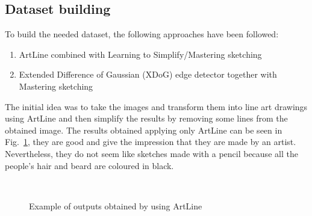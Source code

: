 \subsection{Dataset building}
To build the needed dataset, the following approaches have been followed:
\begin{enumerate}
    \item ArtLine combined with Learning to Simplify/Mastering sketching
    \item Extended Difference of Gaussian (XDoG) edge detector together with Mastering sketching
\end{enumerate}
The initial idea was to take the images and transform them into line art drawings using ArtLine and then simplify the results by removing some lines from the obtained image.
The results obtained applying only ArtLine can be seen in Fig.~\ref{fig:artlineRes}, they are good and give the impression that they are made by an artist. Nevertheless, they do not seem like sketches made with a pencil because all the people's hair and beard are coloured in black.
\begin{figure}[htbp]
    \centering
     \quad
     \\
     \quad
    \caption{Example of outputs obtained by using ArtLine}
    \label{fig:artlineRes}
\end{figure}

